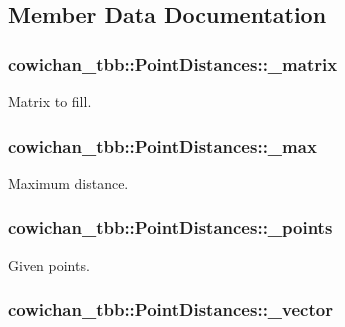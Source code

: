 \subsection{Member Data Documentation}
\hypertarget{classcowichan__tbb_1_1_point_distances_2f52c8fa9b61e6baf83ff17afd01cc14}{
\subsubsection[{\_\-matrix}]{ {\bf cowichan\_\-tbb::PointDistances::\_\-matrix}}}
\label{classcowichan__tbb_1_1_point_distances_2f52c8fa9b61e6baf83ff17afd01cc14}


Matrix to fill. \hypertarget{classcowichan__tbb_1_1_point_distances_e765ab87c711d42e65fe9a5558e2b5e2}{
\subsubsection[{\_\-max}]{ {\bf cowichan\_\-tbb::PointDistances::\_\-max}}}
\label{classcowichan__tbb_1_1_point_distances_e765ab87c711d42e65fe9a5558e2b5e2}


Maximum distance. \hypertarget{classcowichan__tbb_1_1_point_distances_98528a38b93f367d6f5da78d4efb7fa7}{
\subsubsection[{\_\-points}]{ {\bf cowichan\_\-tbb::PointDistances::\_\-points}}}
\label{classcowichan__tbb_1_1_point_distances_98528a38b93f367d6f5da78d4efb7fa7}


Given points. \hypertarget{classcowichan__tbb_1_1_point_distances_c125f8f4d3dc01725c1809c9766d0948}{
\subsubsection[{\_\-vector}]{ {\bf cowichan\_\-tbb::PointDistances::\_\-vector}}}
\label{classcowichan__tbb_1_1_point_distances_c125f8f4d3dc01725c1809c9766d0948}


